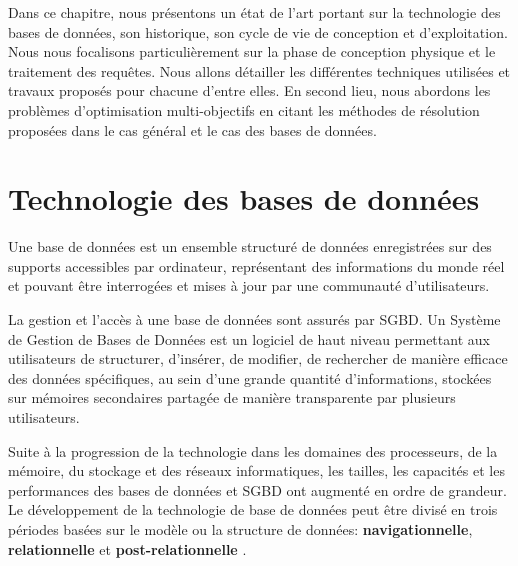 Dans ce chapitre, nous présentons un état de l'art portant sur la technologie des bases de données, son historique, son cycle de vie de conception et d'exploitation. Nous nous focalisons particulièrement sur la phase de conception physique et le traitement des requêtes. Nous allons détailler les différentes techniques utilisées et travaux proposés pour chacune d'entre elles. En second lieu, nous abordons les problèmes d'optimisation multi-objectifs en citant les méthodes de résolution proposées dans le cas général et le cas des bases de données.

\section{Technologie des bases de données}
Une base de données est un ensemble structuré de données enregistrées sur des supports accessibles par ordinateur, représentant des informations du monde réel et pouvant être interrogées et mises à jour par une communauté d’utilisateurs.

La gestion et l’accès à une base de données sont assurés par SGBD. Un Système de Gestion de Bases de Données est un logiciel de haut niveau permettant aux utilisateurs de structurer, d’insérer, de modifier, de rechercher de manière efficace des données spécifiques, au sein d’une grande quantité d’informations, stockées sur mémoires secondaires partagée de manière transparente par plusieurs utilisateurs.


Suite à la progression de la technologie dans les domaines des processeurs, de la mémoire, du stockage et des réseaux informatiques, les tailles, les capacités et les performances des bases de données et SGBD ont augmenté en ordre de grandeur. Le développement de la technologie de base de données peut être divisé en trois périodes basées sur le modèle ou la structure de données: \textbf{navigationnelle}, \textbf{relationnelle} et \textbf{post-relationnelle} \cite{Chu07}.

